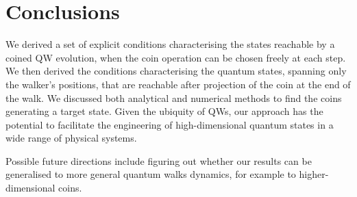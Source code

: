 \section{Conclusions}
\label{sec:QWs:conclusions}
We derived a set of explicit conditions characterising the states reachable by a coined \ac{QW} evolution, when the coin operation can be chosen freely at each step.
We then derived the conditions characterising the quantum states, spanning only the walker's positions, that are reachable after projection of the coin at the end of the walk. We discussed both analytical and numerical methods to find the coins generating a target state.
Given the ubiquity of \acp{QW}, our approach has the potential to facilitate the engineering of high-dimensional quantum states in a wide range of physical systems.

Possible future directions include figuring out whether our results can be generalised to more general quantum walks dynamics, for example to higher-dimensional coins.

